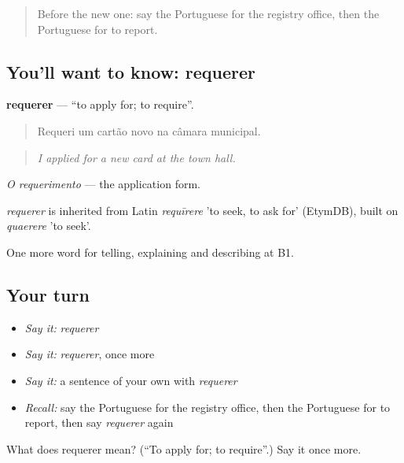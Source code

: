 \label{lesson:PT-C443-requerer}



\begin{quote}
Before the new one: say the Portuguese for the registry office, then the Portuguese for to report.
\end{quote}

\subsection*{You'll want to know: requerer}
\textbf{requerer} — \textquotedblleft{}to apply for; to require\textquotedblright{}.

\begin{quote}
Requeri um cartão novo na câmara municipal.
\end{quote}

\begin{quote}
\emph{I applied for a new card at the town hall.}
\end{quote}

\emph{O requerimento} — the application form.

\begin{cousinweb}
\emph{requerer} is inherited from Latin \emph{requīrere} 'to seek, to ask for' (EtymDB), built on \emph{quaerere} 'to seek'.
\end{cousinweb}

\begin{grammarlens}[title={What you've built}]
One more word for telling, explaining and describing at B1.
\end{grammarlens}

\subsection*{Your turn}
\begin{itemize}
\raggedright
  \item \emph{Say it:} \emph{requerer}
  \item \emph{Say it:} \emph{requerer}, once more
  \item \emph{Say it:} a sentence of your own with \emph{requerer}
  \item \emph{Recall:} say the Portuguese for the registry office, then the Portuguese for to report, then say \emph{requerer} again
\end{itemize}

\begin{tcolorbox}[breakable,colback=teal!4,colframe=teal!35!black,title={Before you move on}]
What does requerer mean? (\textquotedblleft{}To apply for; to require\textquotedblright{}.) Say it once more.
\end{tcolorbox}
